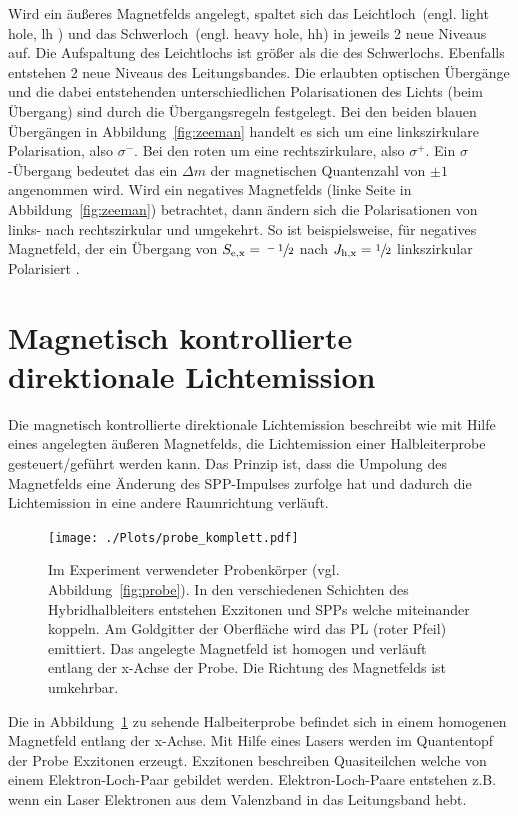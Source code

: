 Wird ein äußeres Magnetfelds angelegt, spaltet sich das Leichtloch~(engl. light hole, lh ) 
und das Schwerloch~(engl. heavy hole, hh) in jeweils 2 neue Niveaus auf.
Die Aufspaltung des Leichtlochs ist größer als die des Schwerlochs.
Ebenfalls entstehen 2 neue Niveaus des Leitungsbandes.
Die erlaubten optischen Übergänge und die dabei entstehenden unterschiedlichen 
Polarisationen des Lichts (beim Übergang) sind durch die Übergangsregeln festgelegt.
Bei den beiden blauen Übergängen in Abbildung~\ref{fig:zeeman} handelt
es sich um eine linkszirkulare Polarisation, also $\sigma^-$.
Bei den roten um eine rechtszirkulare, also  $\sigma^+$. 
Ein $\sigma$-Übergang bedeutet das ein $\Delta m$ der magnetischen Quantenzahl von 
$\pm 1$ angenommen wird.
Wird ein negatives Magnetfelds (linke Seite in Abbildung~\ref{fig:zeeman}) betrachtet,
dann ändern sich die Polarisationen von links- nach rechtszirkular und umgekehrt.
So ist beispielsweise, für negatives Magnetfeld, der ein Übergang von $S_\text{e,x} = \sfrac{-1}{2}$
nach $J_\text{h,x} = \sfrac{1}{2}$ linkszirkular Polarisiert .

\section{Magnetisch kontrollierte direktionale Lichtemission}
Die magnetisch kontrollierte direktionale Lichtemission
beschreibt wie mit Hilfe eines angelegten äußeren Magnetfelds, die Lichtemission
einer Halbleiterprobe gesteuert/geführt werden kann.
Das Prinzip ist, dass die Umpolung des Magnetfelds eine Änderung des SPP-Impulses zurfolge hat 
und dadurch die Lichtemission in eine andere Raumrichtung verläuft.
\begin{figure}
    \centering
    \texttt{[image: ./Plots/probe\_komplett.pdf]}
    \caption{Im Experiment verwendeter Probenkörper (vgl. Abbildung~\ref{fig:probe}).
    In den verschiedenen Schichten des Hybridhalbleiters entstehen Exzitonen und SPPs 
    welche miteinander koppeln. Am Goldgitter der Oberfläche wird das PL (roter Pfeil)
    emittiert.    
    Das angelegte Magnetfeld ist homogen und verläuft entlang der x-Achse der Probe.
    Die Richtung des Magnetfelds ist umkehrbar.}
    \label{fig:komplett}
\end{figure}
\FloatBarrier

Die in Abbildung~\ref{fig:komplett} zu sehende Halbeiterprobe befindet sich 
in einem homogenen Magnetfeld entlang der x-Achse.
Mit Hilfe eines Lasers werden im Quantentopf der Probe Exzitonen erzeugt.
Exzitonen beschreiben Quasiteilchen welche von einem Elektron-Loch-Paar gebildet werden.
Elektron-Loch-Paare entstehen z.B. wenn ein Laser 
Elektronen aus dem Valenzband in das Leitungsband hebt.\cite{jens}

